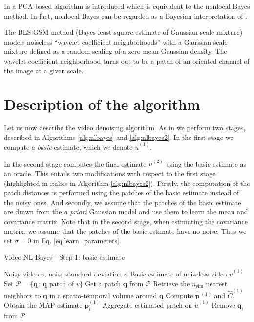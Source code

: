 \documentclass[10pt, journal, twocolumn, final, a4paper]{IEEEtran}
\newcommand{\ma}[1]{\boldsymbol{#1}}
\begin{document}
In \cite{Zhang2010} a PCA-based algorithm is introduced which is equivalent to 
the nonlocal Bayes method. In fact, nonlocal Bayes can be regarded as a Bayesian 
interpretation of \cite{Zhang2010}.

The BLS-GSM method \cite{Portilla2003} (Bayes least square estimate of Gaussian
scale mixture) models noiseless ``wavelet coefficient neighborhoods'' with a
Gaussian scale mixture defined as a random scaling of a zero-mean Gaussian
density. The wavelet coefficient neighborhood turns out to be a patch of an
oriented channel of the image at a given scale.



\section{Description of the algorithm}

Let us now describe the video denoising algorithm. As in
\cite{Dabov2007tip,Dabov2007v,Maggioni2012,Lebrun2013a} we perform two stages, described in 
Algorithms \ref{alg:nlbayes} and \ref{alg:nlbayes2}. In the first stage we
compute a \emph{basic} estimate, which we denote $\widetilde u^{(1)}$. 

In the second stage computes the final estimate $\widetilde u^{(2)}$ using the
basic estimate as an oracle. This entails two modifications with respect to the
first stage (highlighted in italics in Algorithm \ref{alg:nlbayes2}). Firstly, the
computation of the patch distances is performed using the patches of the basic
estimate instead of the noisy ones. And secondly, we assume that the patches of
the basic estimate are drawn from the \textit{a priori} Gaussian model and use
them to learn the mean and covariance matrix. Note that in the second stage,
when estimating the covariance matrix, we assume that the patches of the basic
estimate have no noise. Thus we set $\sigma = 0$ in Eq.
\eqref{eq:learn_parameters}.

\begin{algorithm}
	\caption{Video NL-Bayes - Step 1: basic estimate}
	\label{alg:nlbayes}
		\begin{algorithmic}[1]
		\REQUIRE Noisy video $v$, noise standard deviation
		$\sigma$
		\ENSURE Basic estimate of noiseless video $\widetilde u^{(1)}$
		\STATE Set $\mathcal P = \{\ma q \,:\, \ma q \text{ patch of }  v\}$ 
		\STATE Get a patch $\ma q$ from $\mathcal P$ 
			\STATE Retrieve  the $n_{\text{sim}}$ nearest neighbors to $\ma
			q$ in a spatio-temporal volume around $\ma q$
			\STATE Compute $\widehat{\overline{\ma p}}\,\!^{(1)}$ and
			$\widehat C_{r}^{(1)}$ 
			\FORALL{$n_{\text{sim}}$ neighbors $\ma q_i$ of $\ma q$}
				\STATE Obtain the MAP estimate $\widetilde{\ma p}_i^{(1)}$
				\STATE Aggregate estimated patch on $\widetilde u^{(1)}$
				\STATE Remove $\ma q_i$ from $\mathcal P$
			\ENDFOR
		\ENDWHILE
	\end{algorithmic}
\end{algorithm}
\end{document}
